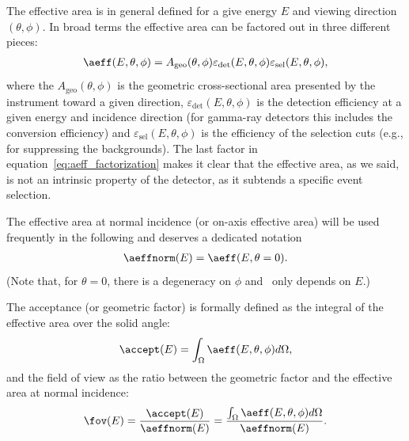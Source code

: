 The effective area is in general defined for a give energy $E$ and viewing
direction $(\theta, \phi)$. In broad terms the effective area can
be factored out in three different pieces:
\begin{align}\label{eq:aeff_factorization}
  \aeff(E, \theta, \phi) =
  A_\text{geo}(\theta, \phi)
  \varepsilon_\text{det}(E, \theta, \phi)
  \varepsilon_\text{sel}(E, \theta, \phi),
\end{align}
where the $A_\text{geo}(\theta, \phi)$ is the geometric cross-sectional area
presented by the instrument toward a given direction,
$\varepsilon_\text{det}(E, \theta, \phi)$ is the detection efficiency at a given
energy and incidence direction (for gamma-ray detectors this includes the
conversion efficiency) and $\varepsilon_\text{sel}(E, \theta, \phi)$ is the
efficiency of the selection cuts (e.g., for suppressing the backgrounds).
The last factor in equation~\eqref{eq:aeff_factorization} makes it clear that
the effective area, as we said, is not an intrinsic property of the detector, as
it subtends a specific event selection.

The effective area at normal incidence (or on-axis effective area)
will be used frequently in the following and deserves a dedicated notation
\begin{align}
  \aeffnorm(E) = \aeff(E, \theta = 0).
\end{align}
(Note that, for $\theta = 0$, there is a degeneracy on $\phi$ and \aeff\
only depends on $E$.)

The acceptance (or geometric factor) is formally defined as the integral
of the effective area over the solid angle:
\begin{align}
  \accept(E) = \int_{\Omega}\aeff(E, \theta, \phi) d\Omega,
\end{align}
and the field of view as the ratio between the geometric factor and the
effective area at normal incidence:
\begin{align}
  \fov(E) = \frac{\accept(E)}{\aeffnorm(E)} =
  \frac{\int_{\Omega}\aeff(E, \theta, \phi) d\Omega}{\aeffnorm(E)}.
\end{align}

